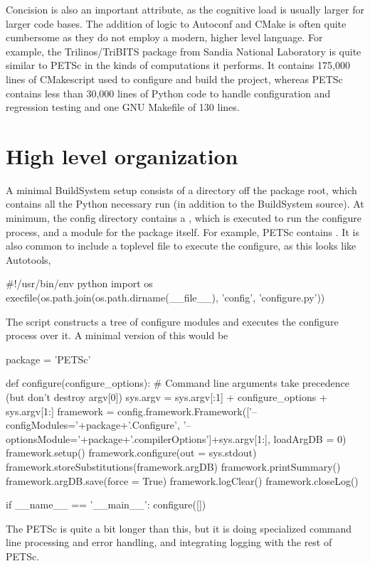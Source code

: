{{{Concision is also an important attribute, as the cognitive load is usually larger for larger code bases. The addition of
logic to Autoconf and CMake is often quite cumbersome as they do not employ a modern, higher level language. For
example, the Trilinos/TriBITS package from Sandia National Laboratory is quite similar to PETSc in the kinds of computations it
performs. It contains 175,000 lines of CMakescript used to configure and build the project, whereas PETSc contains less
than 30,000 lines of Python code to handle configuration and regression testing and one GNU Makefile of 130 lines.

\section{High level organization}

A minimal BuildSystem setup consists of a  directory off the package root, which contains all the Python necessary run (in addition to the BuildSystem source). At minimum, the config directory contains a , which is executed to run the configure process, and a module for the package itself. For example, PETSc contains . It is also common to include a toplevel  file to execute the configure, as this looks like Autotools,
\begin{pythonlisting}
#!/usr/bin/env python
import os
execfile(os.path.join(os.path.dirname(__file__), 'config', 'configure.py'))
\end{pythonlisting}

The  script constructs a tree of configure modules and executes the configure process over it. A minimal version of this would be
\begin{pythonlisting}
package = 'PETSc'

def configure(configure_options):
  # Command line arguments take precedence (but don't destroy argv[0])
  sys.argv = sys.argv[:1] + configure_options + sys.argv[1:]
  framework = config.framework.Framework(['--configModules='+package+'.Configure', '--optionsModule='+package+'.compilerOptions']+sys.argv[1:], loadArgDB = 0)
  framework.setup()
  framework.configure(out = sys.stdout)
  framework.storeSubstitutions(framework.argDB)
  framework.printSummary()
  framework.argDB.save(force = True)
  framework.logClear()
  framework.closeLog()

if __name__ == '__main__':
  configure([])
\end{pythonlisting}
The PETSc  is quite a bit longer than this, but it is doing specialized command line processing and error handling, and integrating logging with the rest of PETSc.

}}}

